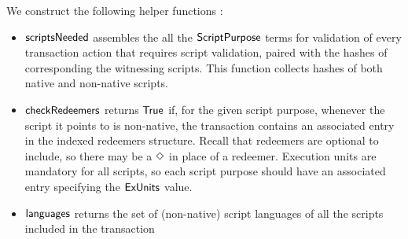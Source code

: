 We construct the following helper functions :

\begin{itemize}
  \item $\mathsf{scriptsNeeded}$ assembles the all the $\mathsf{ScriptPurpose}$ terms
  for validation of every transaction action that requires script validation,
  paired with the hashes of corresponding the witnessing scripts.
  This function collects hashes of both native and non-native scripts.

  \item $\mathsf{checkRedeemers}$ returns $\mathsf{True}$ if, for the given script purpose,
  whenever the script it points to is non-native, the transaction contains an associated entry
  in the indexed redeemers structure.
  Recall that redeemers are optional to include, so there may be a $\Diamond$ in place of
  a redeemer. Execution units are mandatory for all scripts, so each script purpose
  should have an associated entry specifying the $\mathsf{ExUnits}$ value.

  \item $\mathsf{languages}$ returns the set of (non-native) script languages
  of all the scripts included in the transaction
\end{itemize}

